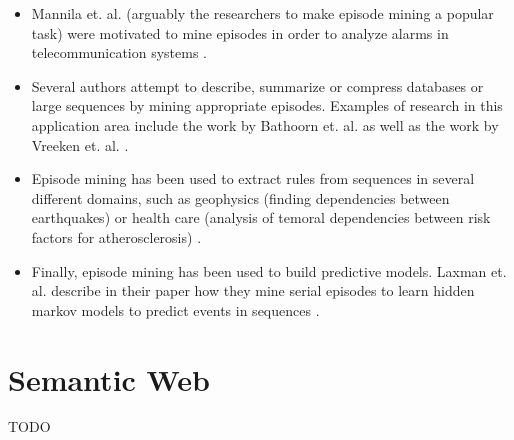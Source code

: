 \begin{itemize}
	\item Mannila et. al. (arguably the researchers to make episode mining a popular task) were motivated to mine episodes in order to analyze alarms in telecommunication systems \cite{mannila1997discovery}.
	\item Several authors attempt to describe, summarize or compress databases or large sequences by mining appropriate episodes. Examples of research in this application area include the work by Bathoorn et. al. \cite{bathoorn2007finding} as well as the work by Vreeken et. al. \cite{vreeken2012summarising}.
	\item Episode mining has been used to extract rules from sequences in several different domains, such as geophysics (finding dependencies between earthquakes) \cite{meger2004constraint} or health care (analysis of temoral dependencies between risk factors for atherosclerosis) \cite{meger2004mining}.
	\item Finally, episode mining has been used to build predictive models. Laxman et. al. describe in their paper how they mine serial episodes to learn hidden markov models to predict events in sequences \cite{laxman2008stream}. 
\end{itemize}

\section{Semantic Web}
\label{subsec_semanticWeb}
TODO






